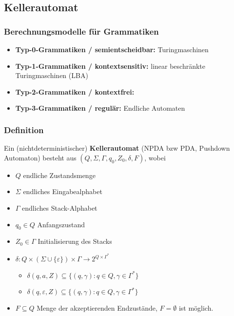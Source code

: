 \subsection{Kellerautomat}

\begin{frame}
	\frametitle{Berechnungsmodelle für Grammatiken}
	
	\begin{itemize}
		\item \textbf{Typ-0-Grammatiken / semientscheidbar:} Turingmaschinen
		\item \textbf{Typ-1-Grammatiken / kontextsensitiv:} linear beschränkte Turingmaschinen (LBA)
		\item \textbf{Typ-2-Grammatiken / kontextfrei:}  \only<2>{Kellerautomaten!}
		\item \textbf{Typ-3-Grammatiken / regulär:} Endliche Automaten
	\end{itemize}
\end{frame}


\begin{frame}
\frametitle{Definition}
Ein (nichtdeterministischer) \textbf{Kellerautomat} (NPDA bzw PDA, Pushdown Automaton) besteht aus $(Q, \Sigma, \Gamma, q_0, Z_0,\delta, F)$, wobei
\begin{itemize}
\item $Q$ endliche Zustandsmenge
\item $\Sigma$ endliches Eingabealphabet
\item $\Gamma$ endliches Stack-Alphabet
\item $q_0 \in Q$ Anfangszustand
\item $Z_0 \in \Gamma$ Initialisierung des Stacks
\item $\delta : Q \times ( \Sigma \cup \{\varepsilon\}) \times \Gamma \rightarrow 2^{Q \times \Gamma^*}$
\begin{itemize}
\item $\delta(q, a, Z) \subseteq \{(q,\gamma) : q \in Q, \gamma \in \Gamma^*\}$
\item $\delta(q, \varepsilon, Z) \subseteq \{(q,\gamma) : q \in Q, \gamma \in \Gamma^*\}$
\end{itemize}
\item $F \subseteq Q$ Menge der akzeptierenden Endzustände, $F=\emptyset$ ist möglich.


\vspace{-4cm}
\end{itemize}
\end{frame}


